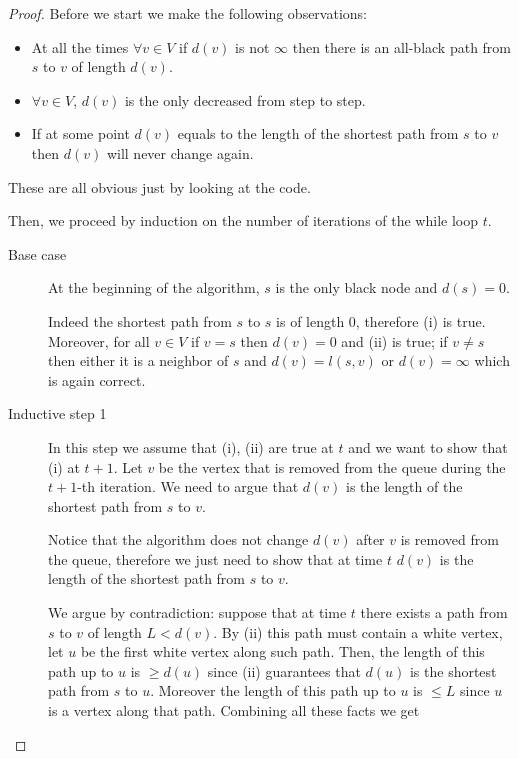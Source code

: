 \documentclass[12pt]{extarticle}
\begin{document}
\begin{proof}
    Before we start we make the following observations:
    \begin{itemize}
        \item At all the times $\forall v \in V$ if $d(v)$ is not $\infty$ then there is an all-black path from $s$ to $v$ of length $d(v)$.
        \item $\forall v \in V$, $d(v)$ is the only decreased from step to step.
        \item If at some point $d(v)$ equals to the length of the shortest path from $s$ to $v$ then $d(v)$ will never change again.
    \end{itemize}
    These are all obvious just by looking at the code.

    Then, we proceed by induction on the number of iterations of the while loop $t$.

    \begin{description}
        \item[Base case]
            At the beginning of the algorithm, $s$ is the only black node and $d(s) = 0$.

            Indeed the shortest path from $s$ to $s$ is of length 0, therefore (i) is true.
            Moreover, for all $v \in V$ if $v = s$ then $d(v) = 0$ and (ii) is true; if $v \neq s$ then either it is a neighbor of $s$ and $d(v) = l(s, v)$ or $d(v) = \infty$ which is again correct.

        \item[Inductive step 1]
            In this step we assume that (i), (ii) are true at $t$ and we want to show that (i) at $t+1$.
            Let $v$ be the vertex that is removed from the queue during the $t+1$-th iteration. We need to argue that $d(v)$ is the length of the shortest path from $s$ to $v$.

            Notice that the algorithm does not  change $d(v)$ after $v$ is removed from the queue, therefore we just need to show that at time $t$ $d(v)$ is the length of the shortest path from $s$ to $v$.

            We argue by contradiction: suppose that at time $t$ there exists a path from $s$ to $v$ of length $L < d(v)$. By (ii) this path must contain a white vertex, let $u$ be the first white vertex along such path. Then, the length of this path up to $u$ is $\geq d(u)$ since (ii) guarantees that $d(u)$ is the shortest path from $s$ to $u$.
            Moreover the length of this path up to $u$ is $\leq L$ since $u$ is a vertex along that path.
            Combining all these facts we get


\end{description}
\end{proof}
\end{document}

